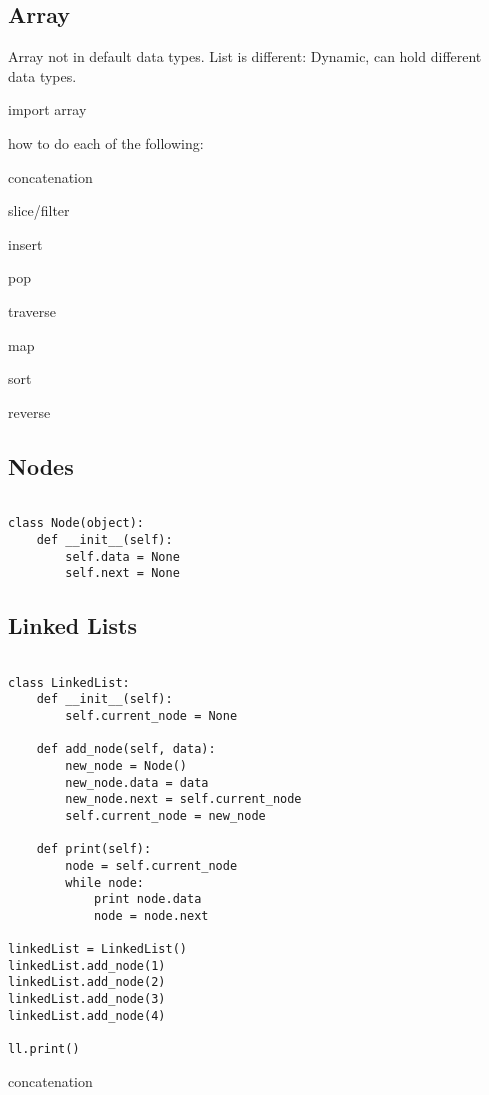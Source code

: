 
\subsection{Array}

Array not in default data types. List is different: Dynamic, can hold different data types.

import array

how to do each of the following:

concatenation

slice/filter

insert

pop

traverse

map

sort

reverse

\subsection{Nodes}

\begin{verbatim}

class Node(object):
    def __init__(self):
        self.data = None
        self.next = None

\end{verbatim}


\subsection{Linked Lists}

\begin{verbatim}

class LinkedList:
    def __init__(self):
        self.current_node = None

    def add_node(self, data):
        new_node = Node()
        new_node.data = data
        new_node.next = self.current_node
        self.current_node = new_node

    def print(self):
        node = self.current_node
        while node:
            print node.data
            node = node.next
            
linkedList = LinkedList()
linkedList.add_node(1)
linkedList.add_node(2)
linkedList.add_node(3)
linkedList.add_node(4)

ll.print()

\end{verbatim}

concatenation

